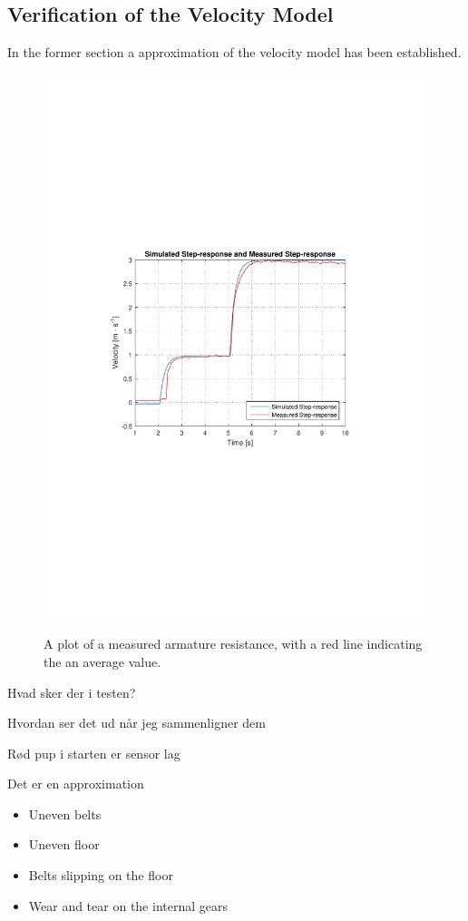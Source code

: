\subsection{Verification of the Velocity Model}
In the former section a approximation of the velocity model has been established. 


\begin{figure}[H]
  \centering
  {
    \includegraphics[width=1.2\textwidth]{figures/SimulationIRLsteprespons2.pdf}
  }
  \caption{A plot of a measured armature resistance, with a red line indicating the an average value.}
  \label{armatureResistance}
\end{figure}



Hvad sker der i testen?

Hvordan ser det ud når jeg sammenligner dem

Rød pup i starten er sensor lag

Det er en approximation


\begin{itemize}
\item Uneven belts 
\item Uneven floor
\item Belts slipping on the floor
\item Wear and tear on the internal gears
\end{itemize}